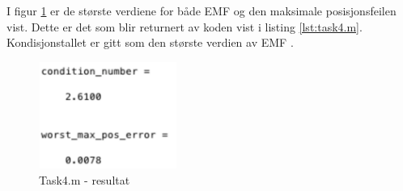 I figur \ref{fig:task4answer} er de største verdiene for både EMF og den maksimale posisjonsfeilen vist. Dette er det som blir returnert av koden vist i listing \ref{lst:task4.m}. Kondisjonstallet er gitt som den største verdien av EMF \cite{Errors}.

\begin{figure}[h]
	\centering
	\includegraphics[width=0.4\textwidth]{sections/Exercise4/task4answer.png}
	\caption{Task4.m - resultat}
	\label{fig:task4answer}
\end{figure}